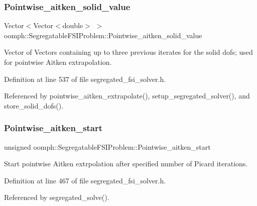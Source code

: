 \subsubsection{\texorpdfstring{Pointwise\+\_\+aitken\+\_\+solid\+\_\+value}{Pointwise\_aitken\_solid\_value}}
{\footnotesize\ttfamily Vector$<$Vector$<$double$>$ $>$ oomph\+::\+Segregatable\+F\+S\+I\+Problem\+::\+Pointwise\+\_\+aitken\+\_\+solid\+\_\+value\hspace{0.3cm}{\ttfamily [protected]}}



Vector of Vectors containing up to three previous iterates for the solid dofs; used for pointwise Aitken extrapolation. 



Definition at line 537 of file segregated\+\_\+fsi\+\_\+solver.\+h.



Referenced by pointwise\+\_\+aitken\+\_\+extrapolate(), setup\+\_\+segregated\+\_\+solver(), and store\+\_\+solid\+\_\+dofs().

\mbox{\label{classoomph_1_1SegregatableFSIProblem_a47bcf35aed40bbb7e1c3778b8dfad501}} 
\subsubsection{\texorpdfstring{Pointwise\+\_\+aitken\+\_\+start}{Pointwise\_aitken\_start}}
{\footnotesize\ttfamily unsigned oomph\+::\+Segregatable\+F\+S\+I\+Problem\+::\+Pointwise\+\_\+aitken\+\_\+start\hspace{0.3cm}{\ttfamily [protected]}}



Start pointwise Aitken extrpolation after specified number of Picard iterations. 



Definition at line 467 of file segregated\+\_\+fsi\+\_\+solver.\+h.



Referenced by segregated\+\_\+solve().

\mbox{\label{classoomph_1_1SegregatableFSIProblem_a6e056ff378e38504d5e9d522820ca8cf}} 
